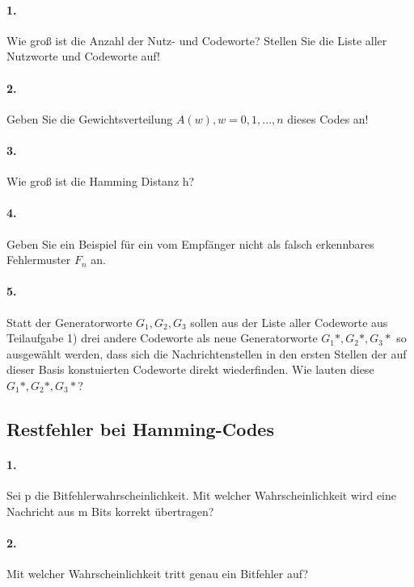 \documentclass[paper=a4, fontsize=11pt]{scrartcl}
\numberwithin{equation}{section}
\numberwithin{figure}{section}
\numberwithin{table}{section}
\begin{document}
\paragraph{1.}
Wie groß ist die Anzahl der Nutz- und Codeworte? Stellen Sie die Liste aller Nutzworte und Codeworte auf!

\paragraph{2.}
Geben Sie die Gewichtsverteilung $A(w), w=0,1, ...,n$ dieses Codes an!

\paragraph{3.}
Wie groß ist die Hamming Distanz h?

\paragraph{4.}
Geben Sie ein Beispiel für ein vom Empfänger nicht als falsch erkennbares Fehlermuster $F_{n}$ an.

\paragraph{5.}
Statt der Generatorworte $G_{1}, G_{2}, G_{3}$ sollen aus der Liste aller Codeworte aus Teilaufgabe 1) drei andere Codeworte als neue Generatorworte $G_{1}*, G_{2}*, G_{3}*$ so ausgewählt werden, dass sich die Nachrichtenstellen in den ersten Stellen der auf dieser Basis konstuierten Codeworte direkt wiederfinden. Wie lauten diese $G_{1}*, G_{2}*, G_{3}*$?

\subsection{Restfehler bei Hamming-Codes}
\paragraph{1.}
Sei p die Bitfehlerwahrscheinlichkeit. Mit welcher Wahrscheinlichkeit wird eine Nachricht aus m Bits korrekt übertragen?

\paragraph{2.}
Mit welcher Wahrscheinlichkeit tritt genau ein Bitfehler auf?
\end{document}
